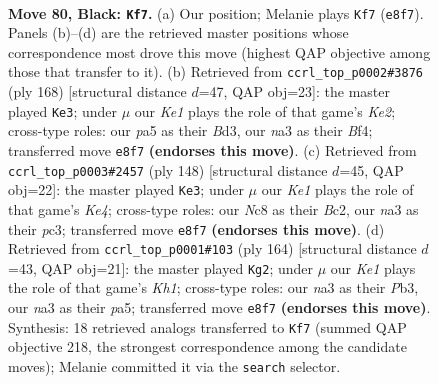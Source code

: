 \documentclass[11pt]{article}
\begin{document}
\clearpage

\begin{figure}[p]\centering
\begin{subfigure}{0.46\textwidth}\centering
\resizebox{\linewidth}{!}{%
\newchessgame
\chessboard[
  setfen={2n1k2K/2P5/p7/P4p1p/4pBb1/N1r3P1/8/R7 b - - 67 80},
  showmover=false,
  pgfstyle=straightmove, color=movearrow, markmove={e8-f7}
]}
\caption{}
\end{subfigure}\hfill
\begin{subfigure}{0.46\textwidth}\centering
\resizebox{\linewidth}{!}{%
\newchessgame
\chessboard[
  setfen={4k3/1b6/p5p1/P2P1pP1/1PP2B1r/3B4/4K3/8 w - - 13 85},
  showmover=false,
  pgfstyle=straightmove, color=movearrow, markmove={e2-e3}
]}
\caption{}
\end{subfigure}
\\[4pt]
\begin{subfigure}{0.46\textwidth}\centering
\resizebox{\linewidth}{!}{%
\newchessgame
\chessboard[
  setfen={1r6/4b1k1/3pP3/3P4/1pR1K3/1Pp5/2B5/8 w - - 20 75},
  showmover=false,
  pgfstyle=straightmove, color=movearrow, markmove={e4-e3}
]}
\caption{}
\end{subfigure}\hfill
\begin{subfigure}{0.46\textwidth}\centering
\resizebox{\linewidth}{!}{%
\newchessgame
\chessboard[
  setfen={5k2/2b5/5p2/pR3B1p/P3P2P/1Pr5/8/7K w - - 1 83},
  showmover=false,
  pgfstyle=straightmove, color=movearrow, markmove={h1-g2}
]}
\caption{}
\end{subfigure}
\caption{\textbf{Move 80, Black: \texttt{Kf7}.} (a) Our position; Melanie plays \texttt{Kf7} (\texttt{e8f7}). Panels (b)--(d) are the retrieved master positions whose correspondence most drove this move (highest QAP objective among those that transfer to it). (b) Retrieved from \texttt{ccrl\_top\_p0002\#3876} (ply 168) [structural distance $d$=47, QAP obj=23]: the master played \texttt{Ke3}; under $\mu$ our \emph{Ke1} plays the role of that game's \emph{Ke2}; cross-type roles: our \emph{p}a5 as their \emph{B}d3, our \emph{n}a3 as their \emph{B}f4; transferred move \texttt{e8f7} \textbf{(endorses this move)}. (c) Retrieved from \texttt{ccrl\_top\_p0003\#2457} (ply 148) [structural distance $d$=45, QAP obj=22]: the master played \texttt{Ke3}; under $\mu$ our \emph{Ke1} plays the role of that game's \emph{Ke4}; cross-type roles: our \emph{N}c8 as their \emph{B}c2, our \emph{n}a3 as their \emph{p}c3; transferred move \texttt{e8f7} \textbf{(endorses this move)}. (d) Retrieved from \texttt{ccrl\_top\_p0001\#103} (ply 164) [structural distance $d$=43, QAP obj=21]: the master played \texttt{Kg2}; under $\mu$ our \emph{Ke1} plays the role of that game's \emph{Kh1}; cross-type roles: our \emph{n}a3 as their \emph{P}b3, our \emph{n}a3 as their \emph{p}a5; transferred move \texttt{e8f7} \textbf{(endorses this move)}. Synthesis: 18 retrieved analogs transferred to \texttt{Kf7} (summed QAP objective 218, the strongest correspondence among the candidate moves); Melanie committed it via the \texttt{search} selector.}
\label{fig:thought-m159}
\end{figure}
\end{document}

